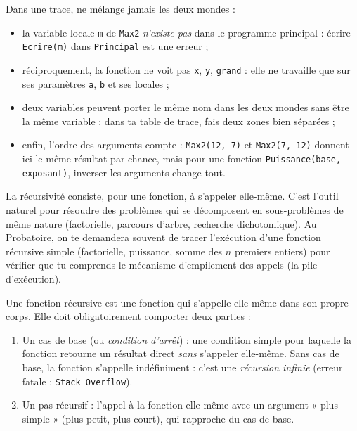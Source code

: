 \documentclass[11pt]{article}
\newcommand{\cle}[1]{{\popxbold\color{popdark}#1}}
\newcounter{popsec}
\newcounter{popsub}
\newcommand{\courssub}[1]{%
  \stepcounter{popsub}%
  \par\vspace{9pt}\noindent{\popxbold\fontsize{11.5}{13}\selectfont\color{popink}{\color{poporange}\thepopsec.\thepopsub}\hspace{6pt}#1}\par\nopagebreak\vspace{4pt}
}
\begin{document}
\begin{attention}
Dans une trace, ne mélange jamais les deux mondes :
\begin{itemize}
  \item la variable locale \texttt{m} de \texttt{Max2} \emph{n'existe pas} dans le programme principal : écrire \texttt{Ecrire(m)} dans \texttt{Principal} est une erreur ;
  \item réciproquement, la fonction ne voit pas \texttt{x}, \texttt{y}, \texttt{grand} : elle ne travaille que sur ses paramètres \texttt{a}, \texttt{b} et ses locales ;
  \item deux variables peuvent porter le même nom dans les deux mondes sans être la même variable : dans ta table de trace, fais deux zones bien séparées ;
  \item enfin, l'ordre des arguments compte : \texttt{Max2(12, 7)} et \texttt{Max2(7, 12)} donnent ici le même résultat par chance, mais pour une fonction \texttt{Puissance(base, exposant)}, inverser les arguments change tout.
\end{itemize}
\end{attention}

\courssub{Fonctions récursives simples}

\begin{savaistu}
La récursivité consiste, pour une fonction, à s'appeler elle-même. C'est l'outil naturel pour résoudre des problèmes qui se décomposent en sous-problèmes de même nature (factorielle, parcours d'arbre, recherche dichotomique). Au Probatoire, on te demandera souvent de tracer l'exécution d'une fonction récursive simple (factorielle, puissance, somme des $n$ premiers entiers) pour vérifier que tu comprends le mécanisme d'empilement des appels (la \cle{pile d'exécution}).
\end{savaistu}

\begin{definition}
Une \cle{fonction récursive} est une fonction qui s'appelle elle-même dans son propre corps. Elle doit obligatoirement comporter deux parties :
\begin{enumerate}
  \item Un \cle{cas de base} (ou \emph{condition d'arrêt}) : une condition simple pour laquelle la fonction retourne un résultat direct \emph{sans} s'appeler elle-même. Sans cas de base, la fonction s'appelle indéfiniment : c'est une \emph{récursion infinie} (erreur fatale : \texttt{Stack Overflow}).
  \item Un \cle{pas récursif} : l'appel à la fonction elle-même avec un argument « plus simple » (plus petit, plus court), qui rapproche du cas de base.
\end{enumerate}
\end{definition}
\end{document}
